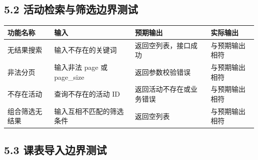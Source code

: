 \subsection{5.2
活动检索与筛选边界测试}\label{ux6d3bux52a8ux68c0ux7d22ux4e0eux7b5bux9009ux8fb9ux754cux6d4bux8bd5}

{\def\LTcaptype{none} %
\begin{longtable}[]{@{}|
  >{\raggedright\arraybackslash}p{}|
  >{\raggedright\arraybackslash}p{}|
  >{\raggedright\arraybackslash}p{}|
  >{\raggedright\arraybackslash}p{}|@{}}
\hline
\rowcolor{gray!12}
\begin{minipage}[b]{\linewidth}\raggedright
\bfseries 功能名称
\end{minipage} & \begin{minipage}[b]{\linewidth}\raggedright
\bfseries 输入
\end{minipage} & \begin{minipage}[b]{\linewidth}\raggedright
\bfseries 预期输出
\end{minipage} & \begin{minipage}[b]{\linewidth}\raggedright
\bfseries 实际输出
\end{minipage} \\
\hline
\endhead
\hline
\endlastfoot
无结果搜索 & 输入不存在的关键词 & 返回空列表，接口成功 &
与预期输出相符 \\
\hline
非法分页 & 输入非法 page 或 page\_size & 返回参数校验错误 &
与预期输出相符 \\
\hline
不存在活动 & 查询不存在的活动 ID & 返回活动不存在或业务错误 &
与预期输出相符 \\
\hline
组合筛选无结果 & 输入互相不匹配的筛选条件 & 返回空列表 &
与预期输出相符 \\
\hline
\end{longtable}
}

\subsection{5.3
课表导入边界测试}\label{ux8bfeux8868ux5bfcux5165ux8fb9ux754cux6d4bux8bd5}


